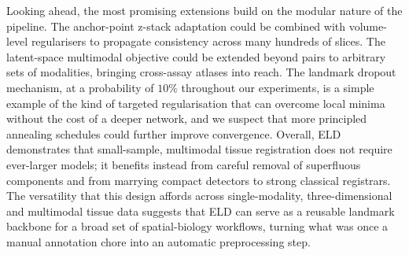 \documentclass[11pt]{article}
\begin{document}
Looking ahead, the most promising extensions build on the modular nature of the pipeline. The anchor-point z-stack adaptation could be combined with volume-level regularisers to propagate consistency across many hundreds of slices. The latent-space multimodal objective could be extended beyond pairs to arbitrary sets of modalities, bringing cross-assay atlases into reach. The landmark dropout mechanism, at a probability of $10\%$ throughout our experiments, is a simple example of the kind of targeted regularisation that can overcome local minima without the cost of a deeper network, and we suspect that more principled annealing schedules could further improve convergence. Overall, ELD demonstrates that small-sample, multimodal tissue registration does not require ever-larger models; it benefits instead from careful removal of superfluous components and from marrying compact detectors to strong classical registrars. The versatility that this design affords across single-modality, three-dimensional and multimodal tissue data suggests that ELD can serve as a reusable landmark backbone for a broad set of spatial-biology workflows, turning what was once a manual annotation chore into an automatic preprocessing step.



\end{document}
